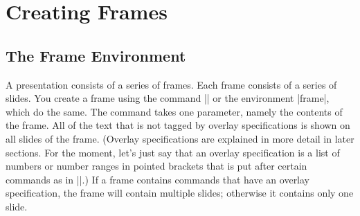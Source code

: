 %
%
%



\section{Creating Frames}

\label{section-frames}

\subsection{The Frame Environment}

A presentation consists of a series of frames. Each frame consists of
a series of slides. You create a frame using the command
|\frame| or the environment |frame|, which do the same. The command
takes one parameter, namely the contents of the frame. All of the
text that is not tagged by overlay specifications is shown on all
slides of the frame. (Overlay specifications are explained
in more detail in later sections. For the moment, let's just say
that an overlay specification is a list of numbers or number ranges in
pointed brackets that is put after certain commands as in
||.) If a frame contains commands that have an
overlay specification, the frame will contain multiple slides;
otherwise it contains only one slide.

